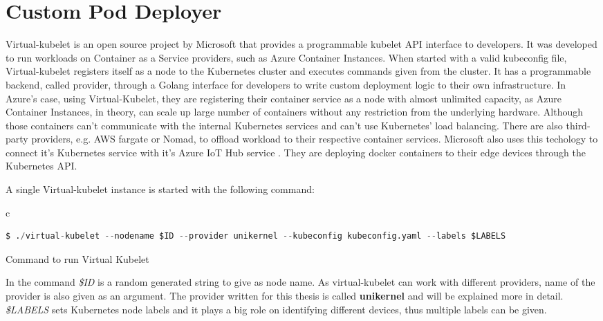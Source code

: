\section{Custom Pod Deployer}
Virtual-kubelet \cite{virtual} is an open source project by Microsoft that provides a programmable kubelet API interface to developers. It was developed to run workloads on Container as a Service providers, such as Azure Container Instances. When started with a valid kubeconfig file, Virtual-kubelet registers itself as a node to the Kubernetes cluster and executes commands given from the cluster. It has a programmable backend, called provider, through a Golang interface for developers to write custom deployment logic to their own infrastructure. In Azure's case, using Virtual-Kubelet, they are registering their container service as a node with almost unlimited capacity, as Azure Container Instances, in theory, can scale up large number of containers without any restriction from the underlying hardware. Although those containers can't communicate with the internal Kubernetes services and can't use Kubernetes' load balancing. There are also third-party providers, e.g. AWS fargate or Nomad, to offload workload to their respective container services. Microsoft also uses this techology to connect it's Kubernetes service with it's Azure IoT Hub service \cite{Chandra2019}. They are deploying docker containers to their edge devices through the Kubernetes API.

A single Virtual-kubelet instance is started with the following command:
\begin{code}[htpb]
  \centering
  \begin{tabular}{c}
    \begin{lstlisting}[language=python]
      $ ./virtual-kubelet --nodename $ID --provider unikernel --kubeconfig kubeconfig.yaml --labels $LABELS
      \end{lstlisting}
\end{tabular}
\caption{Command to run Virtual Kubelet}\label{lst:vkcommand}
\end{code}


In the command \textit{\$ID} is a random generated string to give as node name. As virtual-kubelet can work with different providers, name of the provider is also given as an argument. The provider written for this thesis is called \textbf{unikernel} and will be explained more in detail. \textit{\$LABELS} sets Kubernetes node labels and it plays a big role on identifying different devices, thus multiple labels can be given.

